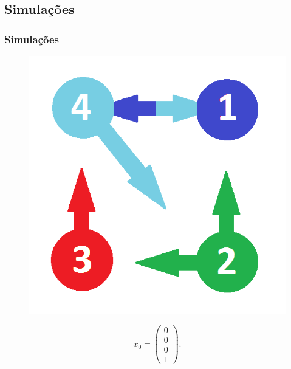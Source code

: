 \documentclass{beamer}
\begin{document}
\begin{frame}
	\section{Simulações}
	\frametitle{Simulações}
	
\vspace{-0.5cm}	
	
\begin{figure}[!htb]
	\centering
	\includegraphics[scale=0.25]{figures/grafo}
	\label{}
\end{figure}	

\vspace{-0.5cm}

\begin{equation}\label{x0}
x_0 = \begin{pmatrix}
0\\ 0\\ 0\\ 1
\end{pmatrix}.
\end{equation}
	
\end{frame}
\end{document}
